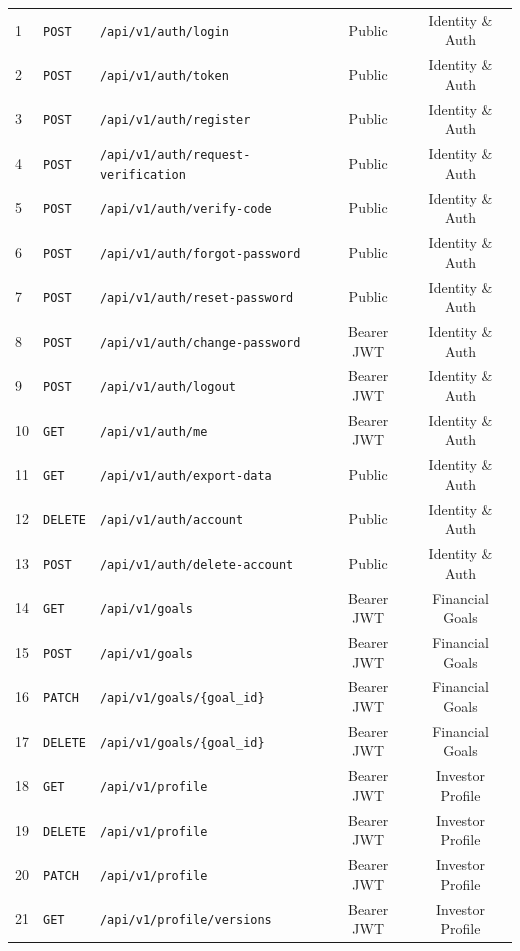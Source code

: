 \begin{small}
\begin{xltabular}{\textwidth}{llp{7.2cm}cc}
1 & \texttt{POST} & \texttt{/api/v1/auth/login} & Public & Identity \& Auth \\
2 & \texttt{POST} & \texttt{/api/v1/auth/token} & Public & Identity \& Auth \\
3 & \texttt{POST} & \texttt{/api/v1/auth/register} & Public & Identity \& Auth \\
4 & \texttt{POST} & \texttt{/api/v1/auth/request-verification} & Public & Identity \& Auth \\
5 & \texttt{POST} & \texttt{/api/v1/auth/verify-code} & Public & Identity \& Auth \\
6 & \texttt{POST} & \texttt{/api/v1/auth/forgot-password} & Public & Identity \& Auth \\
7 & \texttt{POST} & \texttt{/api/v1/auth/reset-password} & Public & Identity \& Auth \\
8 & \texttt{POST} & \texttt{/api/v1/auth/change-password} & Bearer JWT & Identity \& Auth \\
9 & \texttt{POST} & \texttt{/api/v1/auth/logout} & Bearer JWT & Identity \& Auth \\
10 & \texttt{GET} & \texttt{/api/v1/auth/me} & Bearer JWT & Identity \& Auth \\
11 & \texttt{GET} & \texttt{/api/v1/auth/export-data} & Public & Identity \& Auth \\
12 & \texttt{DELETE} & \texttt{/api/v1/auth/account} & Public & Identity \& Auth \\
13 & \texttt{POST} & \texttt{/api/v1/auth/delete-account} & Public & Identity \& Auth \\
14 & \texttt{GET} & \texttt{/api/v1/goals} & Bearer JWT & Financial Goals \\
15 & \texttt{POST} & \texttt{/api/v1/goals} & Bearer JWT & Financial Goals \\
16 & \texttt{PATCH} & \texttt{/api/v1/goals/\{goal\_id\}} & Bearer JWT & Financial Goals \\
17 & \texttt{DELETE} & \texttt{/api/v1/goals/\{goal\_id\}} & Bearer JWT & Financial Goals \\
18 & \texttt{GET} & \texttt{/api/v1/profile} & Bearer JWT & Investor Profile \\
19 & \texttt{DELETE} & \texttt{/api/v1/profile} & Bearer JWT & Investor Profile \\
20 & \texttt{PATCH} & \texttt{/api/v1/profile} & Bearer JWT & Investor Profile \\
21 & \texttt{GET} & \texttt{/api/v1/profile/versions} & Bearer JWT & Investor Profile \\

\end{xltabular}
\end{small}
